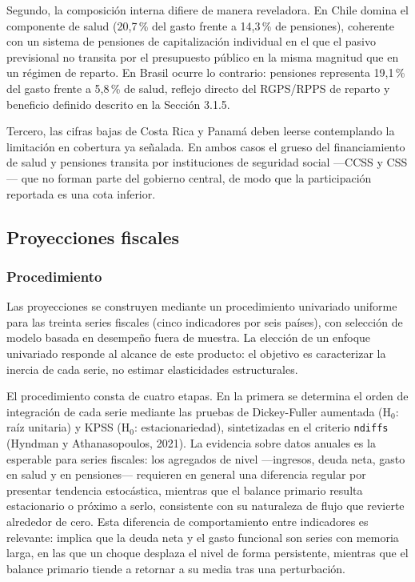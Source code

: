 \documentclass[12pt, letterpaper]{article}
\begin{document}
Segundo, la composición interna difiere de manera reveladora. En Chile domina el
componente de salud (20,7\,\% del gasto frente a 14,3\,\% de pensiones), coherente con
un sistema de pensiones de capitalización individual en el que el pasivo previsional no
transita por el presupuesto público en la misma magnitud que en un régimen de reparto.
En Brasil ocurre lo contrario: pensiones representa 19,1\,\% del gasto frente a 5,8\,\%
de salud, reflejo directo del RGPS/RPPS de reparto y beneficio definido descrito en la
Sección 3.1.5. 

Tercero, las cifras bajas de Costa Rica y Panamá deben leerse contemplando la limitación en cobertura ya señalada. En ambos casos el grueso del financiamiento de salud y pensiones
transita por instituciones de seguridad social —CCSS y CSS— que no forman parte del gobierno central, de modo que la participación reportada es una cota inferior. 

\subsection{Proyecciones fiscales}

\subsubsection{Procedimiento}

Las proyecciones se construyen mediante un procedimiento univariado uniforme para las treinta series fiscales (cinco indicadores por seis países), con selección de modelo
basada en desempeño fuera de muestra. La elección de un enfoque univariado responde al
alcance de este producto: el objetivo es caracterizar la inercia de cada serie, no
estimar elasticidades estructurales.

El procedimiento consta de cuatro etapas. En la primera se determina el orden de integración de cada serie mediante las pruebas de Dickey-Fuller aumentada
(H$_0$: raíz unitaria) y KPSS (H$_0$: estacionariedad), sintetizadas en el criterio
\texttt{ndiffs} (Hyndman y Athanasopoulos, 2021). La evidencia sobre datos anuales es la esperable para series fiscales: los agregados de nivel —ingresos, deuda neta, gasto en
salud y en pensiones— requieren en general una diferencia regular por presentar tendencia estocástica, mientras que el balance primario resulta estacionario o próximo
a serlo, consistente con su naturaleza de flujo que revierte alrededor de cero. Esta
diferencia de comportamiento entre indicadores es relevante: implica que la deuda neta
y el gasto funcional son series con memoria larga, en las que un choque desplaza el
nivel de forma persistente, mientras que el balance primario tiende a retornar a su
media tras una perturbación.
\end{document}
